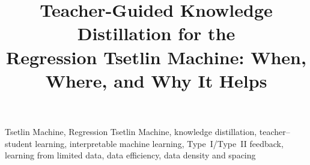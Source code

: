 \documentclass[conference]{IEEEtran}
\begin{document}
\title{Teacher-Guided Knowledge Distillation for the\\
Regression Tsetlin Machine: When, Where, and Why It Helps}

\author{
}

\maketitle

\begin{abstract}

\end{abstract}

\begin{IEEEkeywords}
Tsetlin Machine, Regression Tsetlin Machine, knowledge distillation,
teacher--student learning, interpretable machine learning, Type~I/Type~II feedback,
learning from limited data, data efficiency, data density and spacing
\end{IEEEkeywords}















\end{document}
